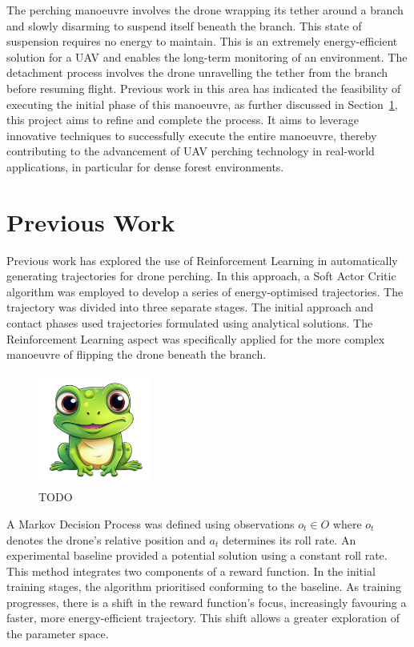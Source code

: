 The perching manoeuvre involves the drone wrapping its tether around a branch and slowly disarming to suspend itself beneath the branch. 
This state of suspension requires no energy to maintain. 
This is an extremely energy-efficient solution for a UAV and enables  the long-term monitoring of an environment. 
The detachment process involves the drone unravelling the tether from the branch before resuming flight. 
Previous work in this area has indicated the feasibility of executing the initial phase of this manoeuvre, as further discussed in Section~\ref{sec:background-prev-work}, this project aims to refine and complete the process. 
It aims to leverage innovative techniques to successfully execute the entire manoeuvre, thereby contributing to the advancement of UAV perching technology in real-world applications, in particular for dense forest environments.

\section{Previous Work}
\label{sec:background-prev-work}


Previous work has explored the use of Reinforcement Learning in automatically generating trajectories for drone perching\cite{learnedTetheredPerchingFabian}.
In this approach, a Soft Actor Critic algorithm was employed to develop a series of energy-optimised trajectories.
The trajectory was divided into three separate stages.
The initial approach and contact phases used trajectories formulated using analytical solutions.
The Reinforcement Learning aspect was specifically applied for the more complex manoeuvre of flipping the drone beneath the branch.

\begin{figure}[htbp]
  \centering
  \includegraphics[width=0.33\textwidth]{frog.png}
  \caption{TODO}
\label{fig:previous-work-manuever-diagram}
\end{figure}

A Markov Decision Process was defined using observations $o_{t} \in O$ where $o_{t}$ denotes the drone's relative position and $a_{t}$ determines its roll rate.
An experimental baseline provided a potential solution using a constant roll rate.
This method integrates two components of a reward function.
In the initial training stages, the algorithm prioritised conforming to the baseline.
As training progresses, there is a shift in the reward function's focus, increasingly favouring a faster, more energy-efficient trajectory.
This shift allows a greater exploration of the parameter space.


